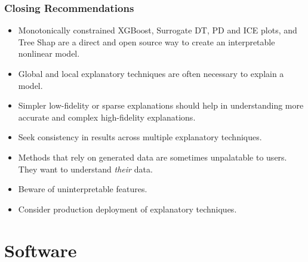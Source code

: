 \documentclass[11pt, 
               aspectratio=169
               ]{beamer}
\begin{document}
		\begin{frame}
		
			\frametitle{Closing Recommendations}
			
				\begin{itemize}
					
					\item Monotonically constrained XGBoost, Surrogate DT, PD and ICE plots, and Tree Shap are a direct and open source way to create an interpretable nonlinear model.
					
					\item Global and local explanatory techniques are often necessary to explain a model.
					
					\item Simpler low-fidelity or sparse explanations should help in understanding more accurate and complex high-fidelity explanations.  
					
					\item Seek consistency in results across multiple explanatory techniques. 
					
					\item Methods that rely on generated data are sometimes unpalatable to users. They want to understand \textit{their} data.
					
					\item Beware of uninterpretable features.
					
					\item Consider production deployment of explanatory techniques.
					
				\end{itemize}
			
			
		\end{frame}

	\section{Software}
\end{document}
